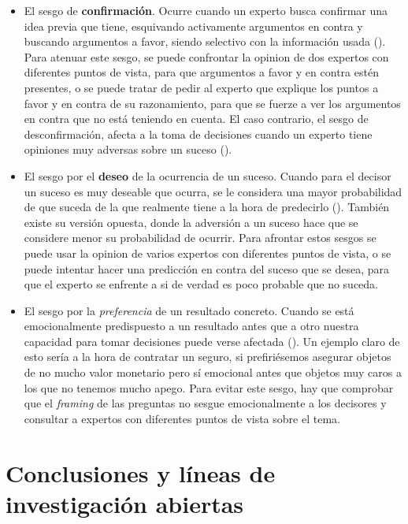 \documentclass[a4paper,11pt]{article}
\begin{document}
\begin{itemize}

\item El sesgo de \textbf{confirmación}. Ocurre cuando un experto busca confirmar una idea previa que tiene, esquivando activamente argumentos en contra y buscando argumentos a favor, siendo selectivo con la información usada (\cite{correia2011}). Para atenuar este sesgo, se puede confrontar la opinion de dos expertos con diferentes puntos de vista, para que argumentos a favor y en contra estén presentes, o se puede tratar de pedir al experto que explique los puntos a favor y en contra de su razonamiento, para que se fuerze a ver los argumentos en contra que no está teniendo en cuenta. El caso contrario, el sesgo de desconfirmación, afecta a la toma de decisiones cuando un experto tiene opiniones muy adversas sobre un suceso (\cite{taber2009}).

\item El sesgo por el \textbf{deseo} de la ocurrencia de un suceso. Cuando para el decisor un suceso es muy deseable que ocurra, se le considera una mayor probabilidad de que suceda de la que realmente tiene a la hora de predecirlo (\cite{krizan2007}). También existe su versión opuesta, donde la adversión a un suceso hace que se considere menor su probabilidad de ocurrir. Para afrontar estos sesgos se puede usar la opinion de varios expertos con diferentes puntos de vista, o se puede intentar hacer una predicción en contra del suceso que se desea, para que el experto se enfrente a si de verdad es poco probable que no suceda.

\item El sesgo por la \textit{preferencia} de un resultado concreto. Cuando se está emocionalmente predispuesto a un resultado antes que a otro nuestra capacidad para tomar decisiones puede verse afectada (\cite{slovic2004}). Un ejemplo claro de esto sería a la hora de contratar un seguro, si prefiriésemos asegurar objetos de no mucho valor monetario pero sí emocional antes que objetos muy caros a los que no tenemos mucho apego. Para evitar este sesgo, hay que comprobar que el \textit{framing} de las preguntas no sesgue emocionalmente a los decisores y consultar a expertos con diferentes puntos de vista sobre el tema.

\end{itemize}

\section{Conclusiones y líneas de investigación abiertas}
\end{document}
